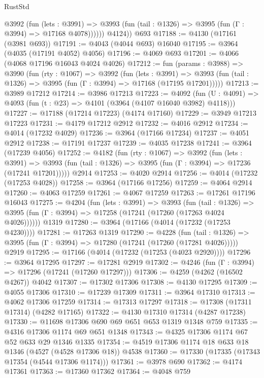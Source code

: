 \begin{lexlean}{RustStd}
\begin{coremodule}
{\begin{coremodule}
{{{{{{{{{{{{{{{{{{{{{{{{{{{{{{{{{{{{{{            @3992
              (fun (lets : @3991) =>
              @3993 (fun (tail : @1326) => @3995 (fun (Γ : @3994) => @17168 @4078))))))
        @4124))
    @693
@17188 := @4130 (@17161 (@3981 @693))
@17191 := @4043 (@4044 @693) @16040
@17195 := @3964 (@4035 (@17191 @4052) @4056)
@17196 := @4069 @693
@17201 := @4066 (@4068 @17196 @16043 @4024 @4026)
@17212 := fun (params : @3988) =>
  @3990
    (fun (rty : @1067) =>
    @3992
      (fun (lets : @3991) =>
      @3993 (fun (tail : @1326) => @3995 (fun (Γ : @3994) => @17168 (@17195 @17201)))))
@17213 := @3989 @17212
@17214 := @3986 @17213
@17223 := @4092
    (fun (U : @4091) => @4093 (fun (t : @23) => @4101 (@3964 (@4107 @16040 @3982) @4118)))
@17227 := @17188 (@17214 @17223) (@4174 @17160)
@17229 := @3949 @17213 @17223
@17231 := @4179 @17212 @2912
@17232 := @4016 @2912
@17234 := @4014 (@17232 @4029)
@17236 := @3964 (@17166 @17234)
@17237 := @4051 @2912
@17238 := @17191 @17237
@17239 := @4035 @17238
@17241 := @3964 (@17239 @4056)
@17252 := @4182
    (fun (rty : @1067) =>
    @3992
      (fun (lets : @3991) =>
      @3993 (fun (tail : @1326) => @3995 (fun (Γ : @3994) => @17236 (@17241 @17201)))))
    @2914
@17253 := @4020 @2914
@17256 := @4014 (@17232 (@17253 @4028))
@17258 := @3964 (@17166 @17256)
@17259 := @4064 @2914
@17260 := @4063 @17259
@17261 := @4067 @17259
@17263 := @17261 @17196 @16043
@17275 := @4204
    (fun (lets : @3991) =>
    @3993
      (fun (tail : @1326) =>
      @3995 (fun (Γ : @3994) => @17258 (@17241 (@17260 (@17263 @4024 @4026))))))
    @1319
@17280 := @3964 (@17166 (@4014 (@17232 (@17253 @4230))))
@17281 := @17263 @1319
@17290 := @4228
    (fun (tail : @1326) => @3995 (fun (Γ : @3994) => @17280 (@17241 (@17260 (@17281 @4026)))))
    @2919
@17295 := @17166 (@4014 (@17232 (@17253 (@4023 @2920))))
@17296 := @3964 @17295
@17297 := @17281 @2919
@17302 := @4246 (fun (Γ : @3994) => @17296 (@17241 (@17260 @17297)))
@17306 := @4259 (@4262 (@16502 @4267)) @4042
@17307 := @17302 @17306
@17308 := @4130 @17295
@17309 := @4055 @17306
@17310 := @17239 @17309
@17311 := @3964 @17310
@17313 := @4062 @17306 @17259
@17314 := @17313 @17297
@17318 := @17308 (@17311 @17314) (@4282 @17165)
@17322 := @4130 @17310 @17314 (@4287 @17238)
@17330 := @11698 @17306 @690 @69 @651 @653 @1319 @1348 @759
@17335 := @4316 @17306 @1174 @69 @651 @1348
@17343 := @4325 @17306 @1174 @67 @52 @633 @29 @1346 @1335
@17354 := @4519 @17306 @1174 @18 @633 @18 @1346 (@4527 (@4528 @17306 @18)) @4538
@17360 := @17330 (@17335 (@17343 @17354 (@4544 @17306 @1174)))
@17361 := @3978 @690
@17362 := @4174 @17361
@17363 := @17360 @17362
@17364 := @4048 @759
}}}}}}}}}}}}}}}}}}}}}}}}}}}}}}}}}}}}}}
\end{coremodule}}
\end{coremodule}
\end{lexlean}
